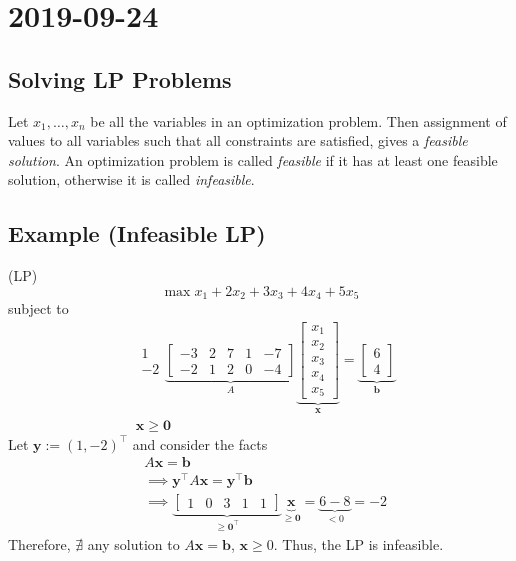 \section{2019-09-24}
\subsection{Solving LP Problems}
Let $x_1,\dots,x_n$ be all the variables in an optimization problem. Then
assignment of values to all variables such that all constraints are satisfied,
gives a \emph{feasible solution}. An optimization problem is called \emph{feasible}
if it has at least one feasible solution, otherwise it is called \emph{infeasible}.

\subsection{Example (Infeasible LP)}
(LP)
\[\max x_1+2x_2+3x_3+4x_4+5x_5\]
subject to
\begin{align*}
    &
    \begin{matrix}
    1\\
    -2
    \end{matrix}
    \underbrace{
        \begin{bmatrix}
        -3 & 2 & 7 & 1 & -7 \\
        -2 & 1 & 2 & 0 & -4
        \end{bmatrix}}_{A}
    \underbrace{\begin{bmatrix}
        x_1\\
        x_2\\
        x_3\\
        x_4\\
        x_5
    \end{bmatrix}}_{\mathbf{x}}
    =
    \underbrace{\begin{bmatrix}
        6\\
        4
    \end{bmatrix}}_{\mathbf{b}}\\
    &\mathbf{x}\ge \mathbf{0}
\end{align*}
Let $\mathbf{y}:=(1,-2)^\top$
and consider the facts
\begin{align*}
    &A\mathbf{x}=\mathbf{b}\\
    &\implies \mathbf{y}^\top A\mathbf{x}=\mathbf{y}^\top \mathbf{b}\\
    &\implies \underbrace{\begin{bmatrix}
        1 & 0 & 3 & 1 & 1
    \end{bmatrix}}_{\ge \mathbf{0}^\top }
    \underbrace{\mathbf{x}}_{\ge \mathbf{0}}=\underbrace{6-8}_{< 0}=-2
\end{align*}
Therefore, $\nexists$ any solution to $A\mathbf{x}=\mathbf{b}$, $\mathbf{x}\ge 0$.
Thus, the LP is infeasible.

